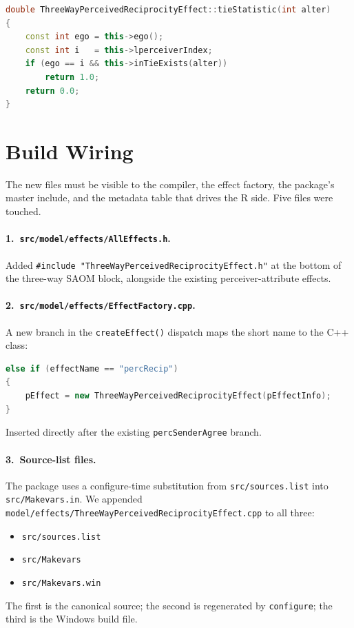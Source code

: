 \documentclass[11pt]{article}
\newcommand{\file}[1]{\texttt{#1}}
\begin{document}
\begin{lstlisting}[language=C++]
double ThreeWayPerceivedReciprocityEffect::tieStatistic(int alter)
{
    const int ego = this->ego();
    const int i   = this->lperceiverIndex;
    if (ego == i && this->inTieExists(alter))
        return 1.0;
    return 0.0;
}
\end{lstlisting}

\section{Build Wiring}

The new files must be visible to the compiler, the effect factory, the
package's master include, and the metadata table that drives the R
side.  Five files were touched.

\paragraph{1.\ \file{src/model/effects/AllEffects.h}.}
Added
\verb|#include "ThreeWayPerceivedReciprocityEffect.h"| at the bottom of
the three-way SAOM block, alongside the existing perceiver-attribute
effects.

\paragraph{2.\ \file{src/model/effects/EffectFactory.cpp}.}
A new branch in the \texttt{createEffect()} dispatch maps the short
name to the C++ class:
\begin{lstlisting}[language=C++]
else if (effectName == "percRecip")
{
    pEffect = new ThreeWayPerceivedReciprocityEffect(pEffectInfo);
}
\end{lstlisting}
Inserted directly after the existing \texttt{percSenderAgree} branch.

\paragraph{3.\ Source-list files.}
The package uses a configure-time substitution from
\file{src/sources.list} into \file{src/Makevars.in}.  We appended
\texttt{model/effects/ThreeWayPerceivedReciprocityEffect.cpp} to all
three:
\begin{itemize}[leftmargin=*]
  \item \file{src/sources.list}
  \item \file{src/Makevars}
  \item \file{src/Makevars.win}
\end{itemize}
The first is the canonical source; the second is regenerated by
\file{configure}; the third is the Windows build file.
\end{document}
